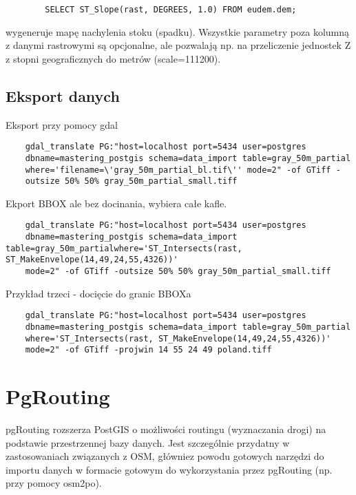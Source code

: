 	\begin{lstlisting}
		SELECT ST_Slope(rast, DEGREES, 1.0) FROM eudem.dem;
	\end{lstlisting}	
	wygeneruje mapę nachylenia stoku (spadku). Wszystkie parametry poza kolumną z danymi rastrowymi są opcjonalne, ale pozwalają np. na przeliczenie jednostek Z z stopni geograficznych do metrów (scale=111200).

	\subsection{Eksport danych}
Eksport przy pomocy gdal
	\begin{lstlisting}
	gdal_translate PG:"host=localhost port=5434 user=postgres
	dbname=mastering_postgis schema=data_import table=gray_50m_partial
	where='filename=\'gray_50m_partial_bl.tif\'' mode=2" -of GTiff -
	outsize 50% 50% gray_50m_partial_small.tiff
	\end{lstlisting}	
	Ekport BBOX ale bez docinania, wybiera całe kafle.
	\begin{lstlisting}	
	gdal_translate PG:"host=localhost port=5434 user=postgres
	dbname=mastering_postgis schema=data_import table=gray_50m_partialwhere='ST_Intersects(rast, ST_MakeEnvelope(14,49,24,55,4326))'
	mode=2" -of GTiff -outsize 50% 50% gray_50m_partial_small.tiff
	\end{lstlisting}
	Przykład trzeci - docięcie do granic BBOXa
	\begin{lstlisting}		
	gdal_translate PG:"host=localhost port=5434 user=postgres
	dbname=mastering_postgis schema=data_import table=gray_50m_partial
	where='ST_Intersects(rast, ST_MakeEnvelope(14,49,24,55,4326))'
	mode=2" -of GTiff -projwin 14 55 24 49 poland.tiff	
    \end{lstlisting}

	\section{PgRouting}
	
	pgRouting rozszerza PostGIS o możliwości routingu (wyznaczania drogi) na podstawie przestrzennej bazy danych. Jest szczególnie przydatny w zastosowaniach związanych z OSM, główniez powodu gotowych narzędzi do importu danych w formacie gotowym do wykorzystania przez pgRouting (np. przy pomocy osm2po).
	
